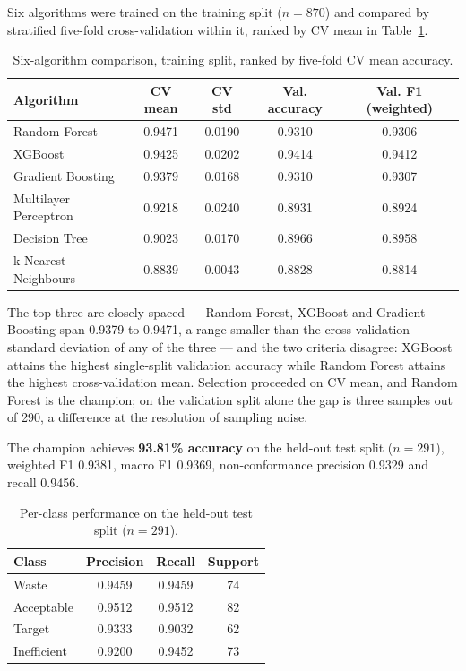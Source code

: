 \documentclass[11pt,a4paper]{article}
\begin{document}
Six algorithms were trained on the training split ($n = 870$) and compared by stratified five-fold cross-validation within it, ranked by CV mean in Table~\ref{tab:algcomp}.

\begin{table}[htbp]
\centering
\caption{Six-algorithm comparison, training split, ranked by five-fold CV mean accuracy.}
\label{tab:algcomp}
\small
\begin{tabular}{@{}lcccc@{}}
\toprule
\textbf{Algorithm} & \textbf{CV mean} & \textbf{CV std} & \textbf{Val. accuracy} & \textbf{Val. F1 (weighted)} \\
\midrule
Random Forest          & 0.9471 & 0.0190 & 0.9310 & 0.9306 \\
XGBoost                 & 0.9425 & 0.0202 & 0.9414 & 0.9412 \\
Gradient Boosting       & 0.9379 & 0.0168 & 0.9310 & 0.9307 \\
Multilayer Perceptron   & 0.9218 & 0.0240 & 0.8931 & 0.8924 \\
Decision Tree           & 0.9023 & 0.0170 & 0.8966 & 0.8958 \\
k-Nearest Neighbours    & 0.8839 & 0.0043 & 0.8828 & 0.8814 \\
\bottomrule
\end{tabular}
\end{table}

The top three are closely spaced --- Random Forest, XGBoost and Gradient Boosting span 0.9379 to 0.9471, a range smaller than the cross-validation standard deviation of any of the three --- and the two criteria disagree: XGBoost attains the highest single-split validation accuracy while Random Forest attains the highest cross-validation mean. Selection proceeded on CV mean, and Random Forest is the champion; on the validation split alone the gap is three samples out of 290, a difference at the resolution of sampling noise.

The champion achieves \textbf{93.81\% accuracy} on the held-out test split ($n = 291$), weighted F1 0.9381, macro F1 0.9369, non-conformance precision 0.9329 and recall 0.9456.

\begin{table}[htbp]
\centering
\caption{Per-class performance on the held-out test split ($n = 291$).}
\label{tab:perclass}
\small
\begin{tabular}{@{}lccc@{}}
\toprule
\textbf{Class} & \textbf{Precision} & \textbf{Recall} & \textbf{Support} \\
\midrule
Waste       & 0.9459 & 0.9459 & 74 \\
Acceptable  & 0.9512 & 0.9512 & 82 \\
Target      & 0.9333 & 0.9032 & 62 \\
Inefficient & 0.9200 & 0.9452 & 73 \\
\bottomrule
\end{tabular}
\end{table}
\end{document}
